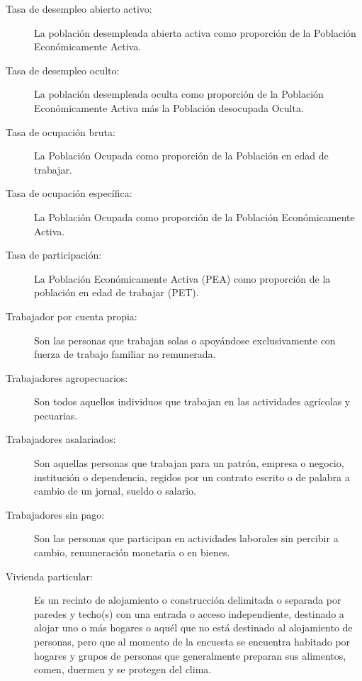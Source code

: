 \begin{description}
	\item[Tasa de desempleo abierto activo:] La población desempleada abierta activa como proporción de la Población Económicamente Activa.
	
	\item[Tasa de desempleo oculto:] La población desempleada oculta como proporción de la Población Económicamente Activa más la Población desocupada Oculta.
	
	\item[Tasa de ocupación bruta:] La Población Ocupada como proporción de la Población en edad de trabajar.
	
	\item[Tasa de ocupación específica:] La Población Ocupada como proporción de la Población Económicamente Activa.
	
	\item[Tasa de participación:] La Población Económicamente Activa (PEA) como proporción de la población en edad de trabajar (PET).
	
	\item[Trabajador por cuenta propia:] Son las personas que trabajan solas o apoyándose exclusivamente con fuerza de trabajo familiar no remunerada.
	
	\item[Trabajadores agropecuarios:] Son todos aquellos individuos que trabajan en las actividades agrícolas y pecuarias.
	
	\item[Trabajadores asalariados:] Son aquellas personas que trabajan para un patrón, empresa o negocio, institución o dependencia, regidos por un contrato escrito o de palabra a cambio de un jornal, sueldo o salario. 
	
	\item[Trabajadores sin pago:] Son las personas que participan en actividades laborales sin percibir a cambio, remuneración monetaria o en bienes.
	
	\item[Vivienda particular:] Es un recinto de alojamiento o construcción delimitada o separada por paredes y techo(s) con una entrada o acceso independiente, destinado a alojar uno o más hogares o aquél que no está destinado al alojamiento de personas, pero que al momento de la encuesta se encuentra habitado por hogares y grupos de personas que generalmente preparan sus alimentos, comen, duermen y se protegen del clima.
	

\end{description}
